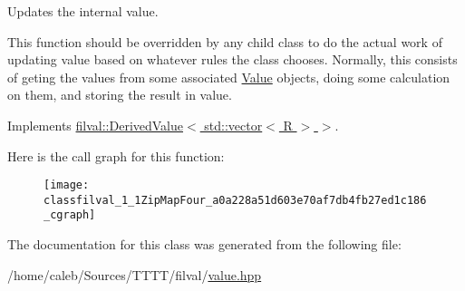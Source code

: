 Updates the internal value. 

This function should be overridden by any child class to do the actual work of updating value based on whatever rules the class chooses. Normally, this consists of geting the values from some associated \hyperlink{classfilval_1_1Value}{Value} objects, doing some calculation on them, and storing the result in value. 

Implements \hyperlink{classfilval_1_1DerivedValue_a74e04450a550454510329a9e6b941304}{filval\+::\+Derived\+Value$<$ std\+::vector$<$ R $>$ $>$}.

Here is the call graph for this function\+:
\nopagebreak
\begin{figure}[H]
\begin{center}
\leavevmode
\texttt{[image: classfilval\_1\_1ZipMapFour\_a0a228a51d603e70af7db4fb27ed1c186\_cgraph]}
\end{center}
\end{figure}


The documentation for this class was generated from the following file\+:\begin{DoxyCompactItemize}
\item 
/home/caleb/\+Sources/\+T\+T\+T\+T/filval/\hyperlink{value_8hpp}{value.\+hpp}\end{DoxyCompactItemize}
